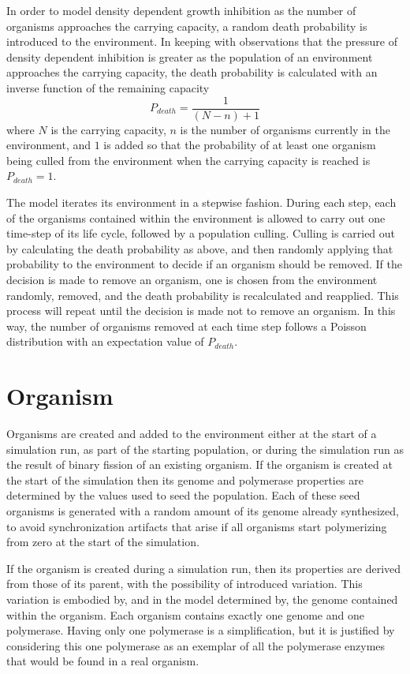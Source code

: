 In order to model density dependent growth inhibition as the number of organisms approaches the carrying capacity, a random death probability is introduced to the environment. In keeping with observations that the pressure of density dependent inhibition is greater as the population of an environment approaches the carrying capacity, the death probability is calculated with an inverse function of the remaining capacity\[
	P_{death} = \frac{1}{(N-n)+1}
\]where $N$ is the carrying capacity, $n$ is the number of organisms currently in the environment, and $1$ is added so that the probability of at least one organism being culled from the environment when the carrying capacity is reached is $P_{death}=1$.

The model iterates its environment in a stepwise fashion. During each step, each of the organisms contained within the environment is allowed to carry out one time-step of its life cycle, followed by a population culling. Culling is carried out by calculating the death probability as above, and then randomly applying that probability to the environment to decide if an organism should be removed. If the decision is made to remove an organism, one is chosen from the environment randomly, removed, and the death probability is recalculated and reapplied. This process will repeat until the decision is made not to remove an organism. In this way, the number of organisms removed at each time step follows a Poisson distribution with an expectation value of $P_{death}$.

\section*{Organism} %
\label{sec:organism}
Organisms are created and added to the environment either at the start of a simulation run, as part of the starting population, or during the simulation run as the result of binary fission of an existing organism. If the organism is created at the start of the simulation then its genome and polymerase properties are determined by the values used to seed the population. Each of these seed organisms is generated with a random amount of its genome already synthesized, to avoid synchronization artifacts that arise if all organisms start polymerizing from zero at the start of the simulation.

If the organism is created during a simulation run, then its properties are derived from those of its parent, with the possibility of introduced variation. This variation is embodied by, and in the model determined by, the genome contained within the organism. Each organism contains exactly one genome and one polymerase. Having only one polymerase is a simplification, but it is justified by considering this one polymerase as an exemplar of all the polymerase enzymes that would be found in a real organism.

